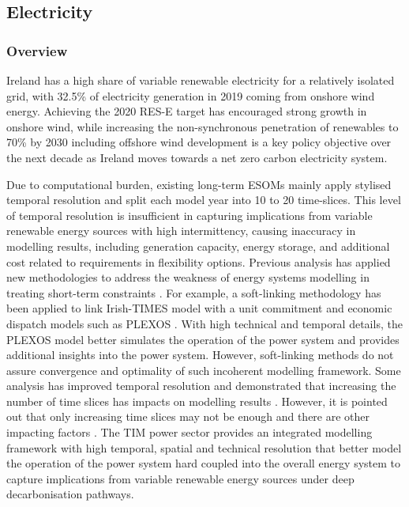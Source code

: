 \documentclass[journal abbreviation, manuscript]{copernicus}
\begin{document}
\subsection{Electricity}
\label{ss:power}

\subsubsection{Overview}
Ireland has a high share of variable renewable electricity for a relatively isolated grid, with 32.5\% of electricity generation in 2019 coming from onshore wind energy. Achieving the 2020 RES-E target has encouraged strong growth in onshore wind, while increasing the non-synchronous penetration of renewables to 70\% by 2030 including offshore wind development is a key policy objective over the next decade as Ireland moves towards a net zero carbon electricity system. 

Due to computational burden, existing long-term ESOMs mainly apply stylised temporal resolution and split each model year into 10 to 20 time-slices. This level of temporal resolution is insufficient in capturing implications from variable renewable energy sources with high intermittency, causing inaccuracy in modelling results, including generation capacity, energy storage, and additional cost related to requirements in flexibility options. Previous analysis has applied new methodologies to address the weakness of energy systems modelling in treating short-term constraints \cite{Collins2017}. For example, a soft-linking methodology has been applied to link Irish-TIMES model with a unit commitment and economic dispatch models such as PLEXOS \cite{Deane2012}. With high technical and temporal details, the PLEXOS model better simulates the operation of the power system and provides additional insights into the power system. However, soft-linking methods do not assure convergence and optimality of such incoherent modelling framework. Some analysis has improved temporal resolution and demonstrated that increasing the number of time slices has impacts on modelling results \cite{Pina2011,Kannan2013,Gaur2019}. However, it is pointed out that only increasing time slices may not be enough and there are other impacting factors \cite{Poncelet2016}. The TIM power sector provides an integrated modelling framework with high temporal, spatial and technical resolution that better model the operation of the power system hard coupled into the overall energy system to capture implications from variable renewable energy sources under deep decarbonisation pathways. 
\end{document}
